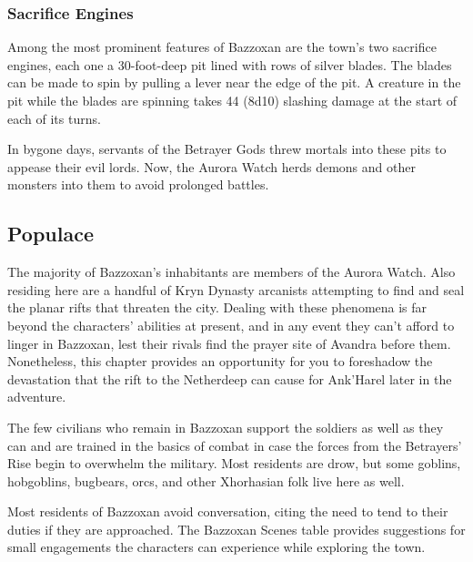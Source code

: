 \documentclass[a4paper, 11pt, bg=full, twocolumn, nooutline]{dndbook}
\begin{document}
\subsubsection{Sacrifice Engines}

Among the most prominent features of Bazzoxan are the town's two sacrifice engines, each one a 30-foot-deep pit lined with rows of silver blades. The blades can be made to spin by pulling a lever near the edge of the pit. A creature in the pit while the blades are spinning takes 44 (8d10) slashing damage at the start of each of its turns.

In bygone days, servants of the Betrayer Gods threw mortals into these pits to appease their evil lords. Now, the Aurora Watch herds demons and other monsters into them to avoid prolonged battles.

\subsection{Populace}

The majority of Bazzoxan's inhabitants are members of the Aurora Watch. Also residing here are a handful of Kryn Dynasty arcanists attempting to find and seal the planar rifts that threaten the city. Dealing with these phenomena is far beyond the characters' abilities at present, and in any event they can't afford to linger in Bazzoxan, lest their rivals find the prayer site of Avandra before them. Nonetheless, this chapter provides an opportunity for you to foreshadow the devastation that the rift to the Netherdeep can cause for Ank'Harel later in the adventure.

The few civilians who remain in Bazzoxan support the soldiers as well as they can and are trained in the basics of combat in case the forces from the Betrayers' Rise begin to overwhelm the military. Most residents are drow, but some goblins, hobgoblins, bugbears, orcs, and other Xhorhasian folk live here as well.

Most residents of Bazzoxan avoid conversation, citing the need to tend to their duties if they are approached. The Bazzoxan Scenes table provides suggestions for small engagements the characters can experience while exploring the town.
\end{document}

